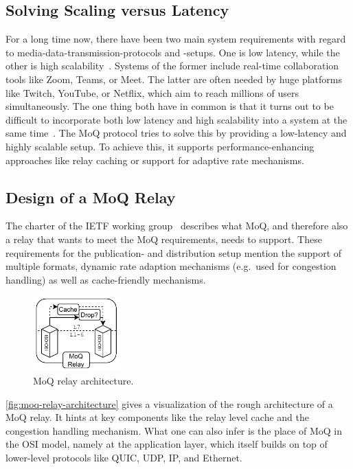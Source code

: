 \subsection{Solving Scaling versus Latency}
For a long time now, there have been two main system requirements with regard to 
media-data-transmission-protocols and -setups.
One is low latency, while the other is high scalability~\parencite{what-is-moq}.
Systems of the former include real-time collaboration tools like Zoom, Teams, or Meet.
The latter are often needed by huge platforms like Twitch, YouTube, or Netflix, which aim to 
reach millions of users simultaneously.
The one thing both have in common is that it turns out to be difficult to incorporate both 
low latency and high scalability into a system at the same time~\parencite{what-is-moq}.
The MoQ protocol tries to solve this by providing a low-latency and
highly scalable setup.
To achieve this, it supports performance-enhancing approaches like relay caching or support 
for adaptive rate mechanisms. %

\subsection{Design of a MoQ Relay}
The charter of the IETF working group~\parencite{moq-charter} describes what MoQ, and therefore also a relay that wants to meet the MoQ requirements, needs to support.
These requirements for the publication- and distribution setup mention the support of 
multiple formats, dynamic rate adaption mechanisms (e.g.~used for congestion handling)
as well as cache-friendly mechanisms.

\begin{figure}[H]
    \centering
    \includegraphics[width=0.3\textwidth]{figures/02_background/moq-relay.drawio.pdf}
    \caption[MoQ relay architecture]{MoQ relay architecture.}\label{fig:moq-relay-architecture}
\end{figure}

\autoref{fig:moq-relay-architecture} gives a visualization of the rough architecture
of a MoQ relay.
It hints at key components like the relay level cache and the congestion handling
mechanism.
What one can also infer is the place of MoQ in the OSI model, namely at the application
layer, which itself builds on top of lower-level protocols like QUIC, UDP, IP, and Ethernet.

